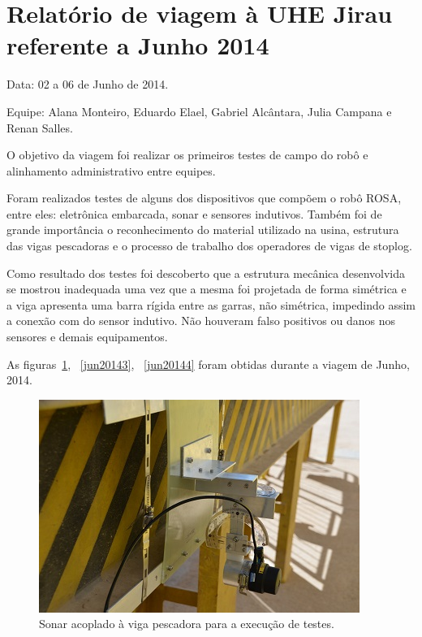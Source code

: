 \section{Relatório de viagem à UHE Jirau
referente a Junho 2014}
Data: 02 a 06 de Junho de 2014.

Equipe: Alana Monteiro, Eduardo Elael, Gabriel Alcântara, Julia Campana e Renan
Salles.

O objetivo da viagem foi realizar os primeiros testes de campo do robô e
alinhamento administrativo entre equipes.

Foram realizados testes de alguns dos dispositivos que compõem o
robô ROSA, entre eles: eletrônica embarcada, sonar e sensores indutivos. Também
foi de grande importância o reconhecimento do material utilizado na usina,
estrutura das vigas pescadoras e o processo de trabalho dos operadores de vigas
de stoplog.

Como resultado dos testes foi descoberto que a estrutura mecânica desenvolvida
se mostrou inadequada uma vez que a mesma foi projetada de forma simétrica e a
viga apresenta uma barra rígida entre as garras, não simétrica, impedindo assim
a conexão com do sensor indutivo. Não houveram falso positivos ou danos nos
sensores e demais equipamentos.

As figuras~\ref{jun20141}, ~\ref{jun20143}, ~\ref{jun20144}
foram obtidas durante a viagem de Junho, 2014.

\begin{figure}[h!]
\centering
  \includegraphics[width=1\linewidth]{Fotos/JirauJunho2014/1.JPG}
  \caption{Sonar acoplado à viga pescadora para a execução de testes.}
  \label{jun20141}
\end{figure}

